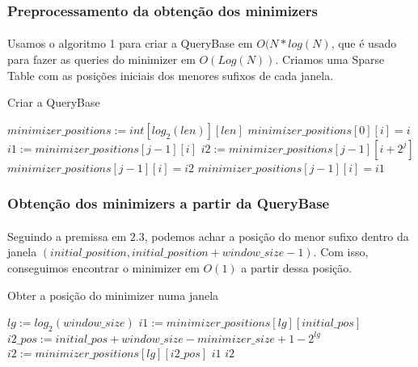 \documentclass{article}
\begin{document}
\subsubsection{Preprocessamento da obtenção dos minimizers}
\paragraph{}{Usamos o algoritmo 1 para criar a QueryBase em \(O(N * log(N)\), que é usado para fazer as queries do minimizer em \(O(Log(N))\). Criamos uma Sparse Table com as posições iniciais dos menores sufixos de cada janela.}
\begin{algorithm}[H]
  \caption{Criar a QueryBase}
  \begin{algorithmic}[1]
      \State $minimizer\_positions := int[log_2(len)][len]$
        \State $minimizer\_positions[0][i] = i$
      \EndFor
          \State  $i1 := minimizer\_positions[j - 1][i]$
          \State  $i2 := minimizer\_positions[j - 1][i + 2^j]$
            \State $minimizer\_positions[j - 1][i] = i2$
          \Else
            \State $minimizer\_positions[j - 1][i] = i1$
          \EndIf
        \EndFor
      \EndFor
    \EndFunction
  \end{algorithmic}
\end{algorithm} 
\subsubsection{Obtenção dos minimizers a partir da QueryBase}
\paragraph{}{Seguindo a premissa em \(2.3\), podemos achar a posição do menor sufixo dentro da janela \((initial\_position, initial\_position + window\_size - 1)\). Com isso, conseguimos encontrar o minimizer em \(O(1)\) a partir dessa posição.}
\begin{algorithm}[H]
  \caption{Obter a posição do minimizer numa janela}
  \begin{algorithmic}[1]
      \State $lg := log_2(window\_size)$
      \State $i1 := minimizer\_positions[lg][initial\_pos]$
      \State $i2\_pos := initial\_pos + window\_size - minimizer\_size +1 - 2^{lg}$
      \State $i2 := minimizer\_positions[lg][i2\_pos]$
        \State \Return $i1$
      \Else
        \State \Return $i2$
      \EndIf
    \EndFunction
  \end{algorithmic}
\end{algorithm} 
\end{document}
